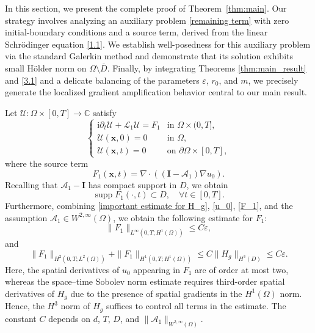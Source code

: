 \documentclass[11pt,reqno,oneside]{amsart}
\numberwithin{equation}{section}
\theoremstyle{definition}
\theoremstyle{remark}
\numberwithin{equation}{section}
\begin{document}
	In this section, we present the complete proof of Theorem~\ref{thm:main}. Our strategy involves analyzing an auxiliary problem \eqref{remaining term} with zero initial-boundary conditions and a source term, derived from the linear Schr\"odinger equation \eqref{1.1}. We establish well-posedness for this  auxiliary problem via the standard Galerkin method and demonstrate that its solution exhibits small H\" older norm on $\Omega \setminus \overline{D}$. Finally, by integrating Theorems \ref{thm:main_result} and \ref{3.1} and a delicate balancing of the parameters $\varepsilon$, $r_0$, and $m$, we precisely generate the localized gradient amplification behavior central to our main result.
	
	Let $\mathcal{U} : \Omega \times [0,T] \rightarrow \mathbb{C}$ satisfy 
	\begin{equation}\label{remaining term}
		\begin{cases}
			\mathrm{i}\partial_t \mathcal{U}+\mathcal{L}_1\mathcal{U} = F_1 & \text{in } \Omega \times (0,T], \\
			\mathcal{U}(\mathbf{x},0) = 0 & \text{in } \Omega, \\
			\mathcal{U}(\mathbf{x},t) = 0 & \text{on } \partial\Omega \times [0,T],
		\end{cases}
	\end{equation}
	where the source term
	\begin{equation}\label{F_1}
		F_1(\mathbf{x}, t)=\nabla \cdot\left((\mathbf{I}-\mathscr{A}_1) \nabla u_0\right).
	\end{equation}
Recalling that $\mathscr{A}_1 - \mathbf{I}$ has compact support in $D$, we obtain
\begin{equation*}
	\operatorname{supp} F_1(\cdot,t) \subset D, \quad \forall t \in [0,T].
\end{equation*}
	Furthermore, combining \eqref{important estimate for H_g}, \eqref{u_0}, \eqref{F_1}, and the assumption $\mathscr{A}_1 \in W^{2,\infty}(\Omega)$, we obtain the following estimate for $F_1$:
	\begin{equation}\label{estimate on F_1,}
		 \| F_1 \|_{L^\infty(0,T;H^1(\Omega))} \leqslant C \varepsilon,
	\end{equation}
	and
	\begin{equation}\label{estimate on F_1}
		\| F_1 \|_{H^2(0,T;L^2(\Omega))} + \| F_1 \|_{H^1(0,T;H^1(\Omega))} 
		\leqslant C \|H_g\|_{H^3(D)} \leqslant C\varepsilon.
	\end{equation}
	Here, the spatial derivatives of \( u_0 \) appearing in \( F_1 \) are of order at most two, whereas the space--time Sobolev norm estimate requires third-order spatial derivatives of \( H_g \) due to the presence of spatial gradients in the \( H^1(\Omega) \) norm. Hence, the \( H^3 \) norm of \( H_g \) suffices to control all terms in the estimate. The constant $C$ depends on $d$, $T$, $D$, and $\|\mathscr{A}_1\|_{W^{2,\infty}(\Omega)}$.
	
\end{document}
